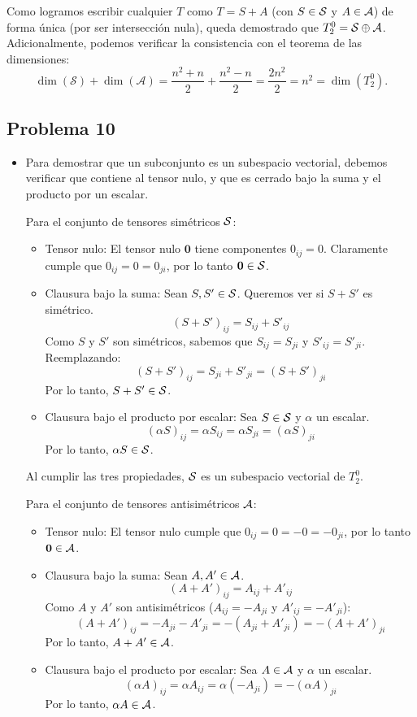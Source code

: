 \documentclass[11pt,spanish]{article}
\begin{document}
\begin{itemize}
\begin{itemize}
\end{itemize}

Como logramos escribir cualquier $T$ como $T = S + A$ (con $S \in \cal{S}$ y $A \in \cal{A}$) de forma única (por ser intersección nula), queda demostrado que $T_2^0 = \cal{S} \oplus \cal{A}$.
Adicionalmente, podemos verificar la consistencia con el teorema de las dimensiones: 
$$
\dim(\mathcal{S}) + \dim(\mathcal{A}) 
= 
\frac{n^2+n}{2} + \frac{n^2-n}{2} 
= 
\frac{2n^2}{2} 
= 
n^2 = \dim(T_2^0)
.
$$

\end{itemize}

\subsection*{Problema 10}

\begin{itemize}

\item[a)] 
Para demostrar que un subconjunto es un subespacio vectorial, debemos verificar que contiene al tensor nulo, y que es cerrado bajo la suma y el producto por un escalar.

Para el conjunto de tensores simétricos $\cal{S}$:
\begin{itemize}
\item Tensor nulo: El tensor nulo $\mathbf{0}$ tiene componentes $0_{ij} = 0$. Claramente cumple que $0_{ij} = 0 = 0_{ji}$, por lo tanto $\mathbf{0} \in \cal{S}$.
\item Clausura bajo la suma: Sean $S, S' \in \cal{S}$. Queremos ver si $S + S'$ es simétrico.
    $$(S + S')_{ij} = S_{ij} + S'_{ij}$$
    Como $S$ y $S'$ son simétricos, sabemos que $S_{ij} = S_{ji}$ y $S'_{ij} = S'_{ji}$. Reemplazando:
    $$(S + S')_{ij} = S_{ji} + S'_{ji} = (S + S')_{ji}$$
    Por lo tanto, $S + S' \in \cal{S}$.
\item Clausura bajo el producto por escalar: Sea $S \in \cal{S}$ y $\alpha$ un escalar.
    $$(\alpha S)_{ij} = \alpha S_{ij} = \alpha S_{ji} = (\alpha S)_{ji}$$
    Por lo tanto, $\alpha S \in \cal{S}$.
\end{itemize}

Al cumplir las tres propiedades, $\cal{S}$ es un subespacio vectorial de $T_2^0$.

Para el conjunto de tensores antisimétricos $\cal{A}$:
\begin{itemize}
\item Tensor nulo: El tensor nulo cumple que $0_{ij} = 0 = -0 = -0_{ji}$, por lo tanto $\mathbf{0} \in \cal{A}$.
\item Clausura bajo la suma: Sean $A, A' \in \cal{A}$.
    $$(A + A')_{ij} = A_{ij} + A'_{ij}$$
    Como $A$ y $A'$ son antisimétricos ($A_{ij} = -A_{ji}$ y $A'_{ij} = -A'_{ji}$):
    $$(A + A')_{ij} = -A_{ji} - A'_{ji} = -(A_{ji} + A'_{ji}) = -(A + A')_{ji}$$
    Por lo tanto, $A + A' \in \cal{A}$.
\item Clausura bajo el producto por escalar: Sea $A \in \cal{A}$ y $\alpha$ un escalar.
    $$(\alpha A)_{ij} = \alpha A_{ij} = \alpha (-A_{ji}) = -(\alpha A)_{ji}$$
    Por lo tanto, $\alpha A \in \cal{A}$.
\end{itemize}


\end{itemize}
\end{document}
